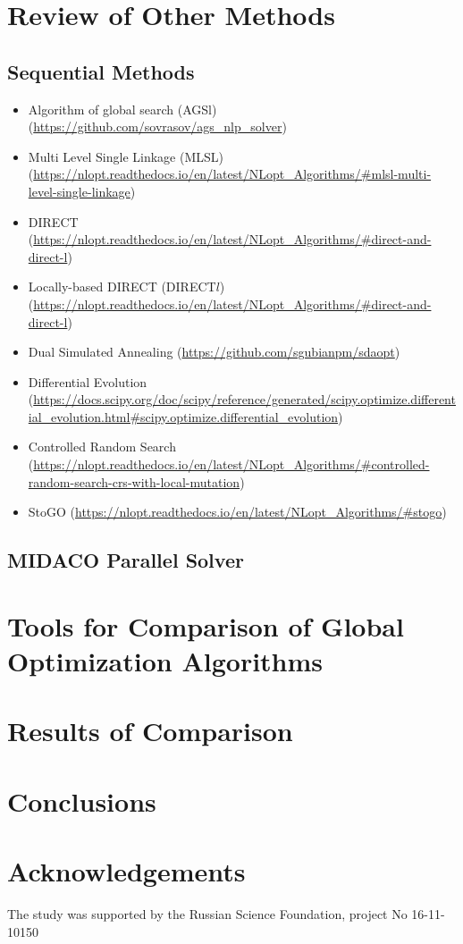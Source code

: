 \documentclass{svproc}
\begin{document}
\section{Review of Other Methods}
\subsection{Sequential Methods}
\begin{itemize}
  \item Algorithm of global search (AGSl) (\url{https://github.com/sovrasov/ags_nlp_solver})
  \item Multi Level Single Linkage (MLSL) (\url{https://nlopt.readthedocs.io/en/latest/NLopt_Algorithms/#mlsl-multi-level-single-linkage})
  \item DIRECT (\url{https://nlopt.readthedocs.io/en/latest/NLopt_Algorithms/#direct-and-direct-l})
  \item Locally-based DIRECT (DIRECT$l$) (\url{https://nlopt.readthedocs.io/en/latest/NLopt_Algorithms/#direct-and-direct-l})
  \item Dual Simulated Annealing (\url{https://github.com/sgubianpm/sdaopt})
  \item Differential Evolution (\url{https://docs.scipy.org/doc/scipy/reference/generated/scipy.optimize.differential_evolution.html#scipy.optimize.differential_evolution})
  \item Controlled Random Search (\url{https://nlopt.readthedocs.io/en/latest/NLopt_Algorithms/#controlled-random-search-crs-with-local-mutation})
  \item StoGO (\url{https://nlopt.readthedocs.io/en/latest/NLopt_Algorithms/#stogo})
\end{itemize}
\subsection{MIDACO Parallel Solver}
\section{Tools for Comparison of Global Optimization Algorithms}
\section{Results of Comparison}
\section{Conclusions}
\section*{Acknowledgements}
The study was supported by the Russian Science Foundation, project No 16-11-
10150

%

{}
\end{document}
